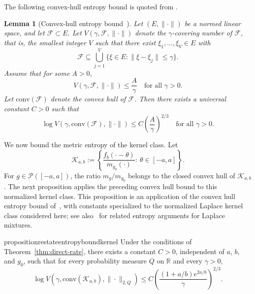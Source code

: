 \documentclass[english, 11pt]{article}
\theoremstyle{plain}
\newtheorem{lemma}[theorem]{Lemma}
\theoremstyle{definition}
\theoremstyle{remark}
\begin{document}
\begin{appendix}
The following convex-hull entropy bound is quoted from \cite[Theorem~1.1]{van1996rates}.

\begin{lemma}[Convex-hull entropy bound~\cite{van1996rates}]\label{lem:convex-hull-entropy}
Let $(E,\|\cdot\|)$ be a normed linear space, and let $\mathcal F\subset E$. 
Let
$V(\gamma,\mathcal F,\|\cdot\|)$ denote the $\gamma$-covering number of $\mathcal F$, that is, the smallest integer $V$ such that there exist $\xi_1,\ldots,\xi_V\in E$ with
\begin{equation*}
\mathcal F\subseteq \bigcup_{j=1}^V \{\xi\in E:\|\xi-\xi_j\|\le \gamma\}.
\end{equation*}
Assume that for some $A>0$,
\begin{equation*}
V(\gamma,\mathcal F,\|\cdot\|)\le \frac{A}{\gamma} \quad \text{for all } \gamma>0.
\end{equation*}
Let $\mathrm{conv}(\mathcal F)$ denote the convex hull of $\mathcal F$.
Then there exists a universal constant $C>0$ such that
\begin{equation*}
\log V(\gamma,\mathrm{conv}(\mathcal F),\|\cdot\|) \le C\left(\frac{A}{\gamma}\right)^{2/3} \quad \text{for all } \gamma>0.
\end{equation*}
\end{lemma}

We now bound the metric entropy of the kernel class. Let
\begin{equation*}
\mathcal K_{a,b}:=\left\{\frac{f_b(\cdot-\theta)}{m_{g_0}(\cdot)}:\ \theta\in[-a,a]\right\}.
\end{equation*}
For $g\in\mathcal P([-a,a])$, the ratio $m_g/m_{g_0}$ belongs to the closed convex hull of $\mathcal K_{a,b}$.
The next proposition applies the preceding convex hull bound to this normalized kernel class.
This proposition is an application of the convex hull entropy bound of~\cite{van1996rates}, with constants specialized to the normalized Laplace kernel class considered here; see also~\cite{scricciolo2018bayes} for related entropy arguments for Laplace mixtures.

\begin{restatable}{proposition}{restateentropyboundkernel}\label{prop:entropy-bound}
Under the conditions of Theorem~\ref{thm:direct-rate}, there exists a constant $C>0$, independent of $a$, $b$, and $g_0$, such that for every probability measure $Q$ on $\mathbb R$ and every $\gamma>0$,
\begin{equation}\label{eq:entropy-bound}
\log V \left(\gamma, \mathrm{conv}(\mathcal K_{a,b}), \|\cdot\|_{2,Q} \right)
\le C\left(\frac{(1+a/b)e^{2a/b}}{\gamma}\right)^{2/3}.
\end{equation}
\end{restatable}


\end{appendix}
\end{document}
